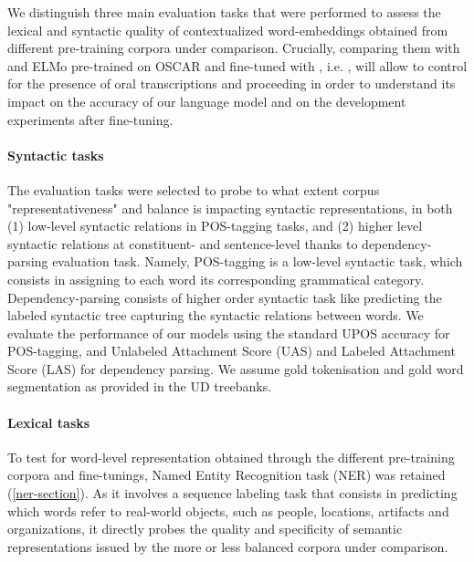 We distinguish three main evaluation tasks that were performed
to assess the lexical and syntactic quality of contextualized word-embeddings obtained from different pre-training corpora under comparison.%
Crucially, comparing them with and ELMo pre-trained on OSCAR and fine-tuned with \Cabernet, i.e. \ELMocoscar, will allow to control for  the presence of oral transcriptions and proceeding in order to understand its impact on the accuracy of our language model and on the development experiments after fine-tuning.%

\paragraph{Syntactic tasks}
The evaluation tasks were selected to probe to what extent corpus "representativeness" and balance is impacting syntactic representations, in both (1) low-level syntactic relations in POS-tagging tasks, and (2) higher level syntactic relations at constituent- and sentence-level thanks to dependency-parsing evaluation task. Namely, POS-tagging is a low-level syntactic task, which consists in assigning to each word its corresponding grammatical category. Dependency-parsing consists of higher order syntactic task like predicting the labeled syntactic tree capturing the syntactic relations between words.
We evaluate the performance of our models using the standard UPOS accuracy for POS-tagging, and Unlabeled Attachment Score (UAS) and Labeled Attachment Score (LAS) for dependency parsing. We assume gold tokenisation and gold word segmentation as provided in the UD treebanks.

\paragraph{Lexical tasks}
To test for word-level representation obtained through the different pre-training corpora and fine-tunings, Named Entity Recognition task (NER) was retained (\ref{ner-section}). As it involves a sequence labeling task that consists in predicting which words refer to real-world objects, such as people, locations, artifacts and organizations, it directly probes the quality and specificity of semantic representations issued by the more or less balanced corpora under comparison.


